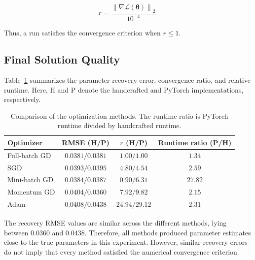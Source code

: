 \documentclass[12pt,oneside]{report}
\begin{document}
\begin{equation}
    r
    =
    \frac{
        \left\lVert
        \nabla \mathcal{L}(\boldsymbol{\theta})
        \right\rVert_2
    }{
        10^{-4}
    }.
\end{equation}

Thus, a run satisfies the convergence criterion when \(r\leq 1\).

\subsection{Final Solution Quality}

Table~\ref{tab:optimizer-comparison} summarizes the parameter-recovery
error, convergence ratio, and relative runtime. Here, H and P denote
the handcrafted and PyTorch implementations, respectively.

\begin{table}[H]
    \centering
    \caption{Comparison of the optimization methods. The runtime ratio
    is PyTorch runtime divided by handcrafted runtime.}
    \label{tab:optimizer-comparison}
    \small
    \begin{tabular}{lccc}
        \toprule
        Optimizer
        & RMSE (H/P)
        & \(r\) (H/P)
        & Runtime ratio (P/H) \\
        \midrule
        Full-batch GD
        & \(0.0381/0.0381\)
        & \(1.00/1.00\)
        & \(1.34\) \\

        SGD
        & \(0.0393/0.0395\)
        & \(4.80/4.54\)
        & \(2.59\) \\

        Mini-batch GD
        & \(0.0384/0.0387\)
        & \(0.90/6.31\)
        & \(27.82\) \\

        Momentum GD
        & \(0.0404/0.0360\)
        & \(7.92/9.82\)
        & \(2.15\) \\

        Adam
        & \(0.0408/0.0438\)
        & \(24.94/29.12\)
        & \(2.31\) \\
        \bottomrule
    \end{tabular}
\end{table}

The recovery RMSE values are similar across the different methods,
lying between \(0.0360\) and \(0.0438\). Therefore, all methods produced
parameter estimates close to the true parameters in this experiment.
However, similar recovery errors do not imply that every method
satisfied the numerical convergence criterion.
\end{document}
